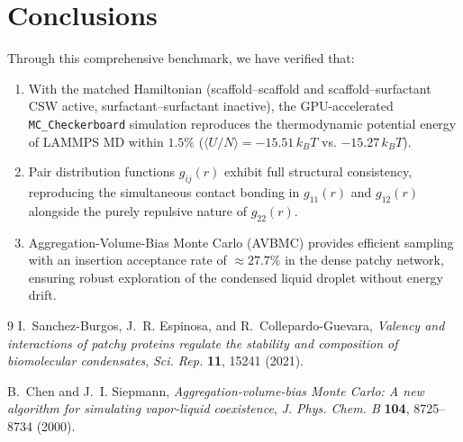 \documentclass[11pt,a4paper]{article}
\begin{document}
\section{Conclusions}
Through this comprehensive benchmark, we have verified that:
\begin{enumerate}
    \setlength{\itemsep}{1pt}
    \setlength{\parskip}{0pt}
    \item With the matched Hamiltonian (scaffold--scaffold and scaffold--surfactant CSW active, surfactant--surfactant inactive), the GPU-accelerated \texttt{MC\_Checkerboard} simulation reproduces the thermodynamic potential energy of LAMMPS MD within $1.5\%$ ($\langle U/N \rangle = -15.51\,k_B T$ vs. $-15.27\,k_B T$).
    \item Pair distribution functions $g_{ij}(r)$ exhibit full structural consistency, reproducing the simultaneous contact bonding in $g_{11}(r)$ and $g_{12}(r)$ alongside the purely repulsive nature of $g_{22}(r)$.
    \item Aggregation-Volume-Bias Monte Carlo (AVBMC) provides efficient sampling with an insertion acceptance rate of $\approx 27.7\%$ in the dense patchy network, ensuring robust exploration of the condensed liquid droplet without energy drift.
\end{enumerate}


\begin{thebibliography}{9}
\setlength{\itemsep}{0pt}
\setlength{\parskip}{0pt}
I.~Sanchez-Burgos, J.~R. Espinosa, and R.~Collepardo-Guevara,
\newblock \textit{Valency and interactions of patchy proteins regulate the stability and composition of biomolecular condensates},
\newblock \textit{Sci. Rep.} \textbf{11}, 15241 (2021).

B.~Chen and J.~I. Siepmann,
\newblock \textit{Aggregation-volume-bias Monte Carlo: A new algorithm for simulating vapor-liquid coexistence},
\newblock \textit{J. Phys. Chem. B} \textbf{104}, 8725--8734 (2000).
\end{thebibliography}
\end{document}
